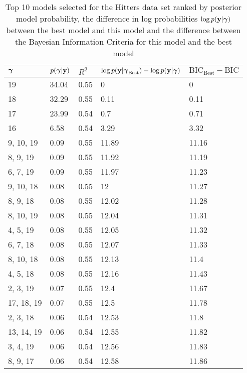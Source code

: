 \documentclass{amsart}
\begin{document}
\begin{table}
\label{tab:numerical_results_hitters}
\caption{Top 10 models selected for the Hitters data set ranked by posterior model probability, the difference
					in log probabilities $\log p({\bf y}|{\boldsymbol \gamma})$ between the best model and this model and the difference
					between the Bayesian Information Criteria for this model and the best model}
\begin{tabular}{|l|llll|}
\hline
${\boldsymbol \gamma}$ & $p({\boldsymbol \gamma}|{\bf y})$ & $R^2$ & $\log p({\bf y} | {\boldsymbol \gamma}_\text{Best}) - \log p({\bf y} | {\boldsymbol \gamma})$ & $\text{BIC}_\text{Best} - \text{BIC}$ \\
\hline
19 &  34.04&  0.55&  0&  0\\
18 &  32.29&  0.55&  0.11&  0.11\\
17 &  23.99&  0.54&  0.7&  0.71\\
16 &  6.58&  0.54&  3.29&  3.32\\
9, 10, 19&  0.09&  0.55&  11.89&  11.16\\
8, 9, 19&  0.09&  0.55&  11.92&  11.19\\
6, 7, 19&  0.09&  0.55&  11.97&  11.23\\
9, 10, 18&  0.08&  0.55&  12&  11.27\\
8, 9, 18&  0.08&  0.55&  12.02&  11.28\\
8, 10, 19&  0.08&  0.55&  12.04&  11.31\\
4, 5, 19&  0.08&  0.55&  12.05&  11.32\\
6, 7, 18&  0.08&  0.55&  12.07&  11.33\\
8, 10, 18&  0.08&  0.55&  12.13&  11.4\\
4, 5, 18&  0.08&  0.55&  12.16&  11.43\\
2, 3, 19&  0.07&  0.55&  12.4&  11.67\\
17, 18, 19&  0.07&  0.55&  12.5&  11.78\\
2, 3, 18&  0.06&  0.54&  12.53&  11.8\\
13, 14, 19&  0.06&  0.54&  12.55&  11.82\\
3, 4, 19&  0.06&  0.54&  12.56&  11.83\\
8, 9, 17&  0.06&  0.54&  12.58&  11.86\\
\hline
\end{tabular}
\end{table}
\end{document}
